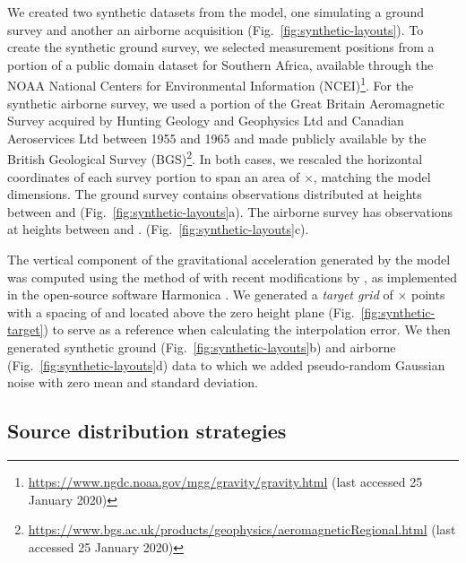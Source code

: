 \documentclass[twocolumn]{article}
\begin{document}
We created two synthetic datasets from the model, one simulating a ground
survey and another an airborne acquisition (Fig.~\ref{fig:synthetic-layouts}).
To create the synthetic ground survey, we selected measurement positions from a
portion of a public domain dataset for Southern Africa, available through the
NOAA National Centers for Environmental Information (NCEI)\footnote{
\url{https://www.ngdc.noaa.gov/mgg/gravity/gravity.html}
(last accessed 25 January 2020)}.
For the synthetic airborne survey, we used a portion of the Great Britain Aeromagnetic
Survey acquired by Hunting Geology and Geophysics Ltd and Canadian Aeroservices
Ltd between 1955 and 1965 and made publicly available by the
British Geological Survey (BGS)\footnote{
\url{https://www.bgs.ac.uk/products/geophysics/aeromagneticRegional.html}
(last accessed 25 January 2020)}.
In both cases, we rescaled the horizontal coordinates of each survey portion to
span an area of \SurveyEasting{}$\times$\SurveyNorthing{}, matching the model
dimensions.
The ground survey contains \GroundSurveyPoints{} observations distributed at
heights between \GroundSurveyMinHeight{} and \GroundSurveyMaxHeight{}
(Fig.~\ref{fig:synthetic-layouts}a).
The airborne survey has \AirborneSurveyPoints{} observations at heights between
\AirborneSurveyMinHeight{} and \AirborneSurveyMaxHeight{}.
(Fig.~\ref{fig:synthetic-layouts}c).

The vertical component of the gravitational acceleration generated by the
model was computed  using the method of \citet{nagy2000, nagy2002}
with recent modifications by \citet{fukushima2020},
as implemented in the open-source software Harmonica \citep{harmonica2020}.
We generated a \emph{target grid} of
\TargetEastingSize{}$\times$\TargetNorthingSize{} points with a spacing of
\TargetSpacing{} and located \TargetHeight{} above the zero height plane
(Fig.~\ref{fig:synthetic-target}) to serve as a reference when calculating the
interpolation error.
We then generated synthetic ground (Fig.~\ref{fig:synthetic-layouts}b) and
airborne (Fig.~\ref{fig:synthetic-layouts}d) data to which we added
pseudo-random Gaussian noise with zero mean and \SurveyNoise{} standard
deviation.


\subsection{Source distribution strategies}
\end{document}
